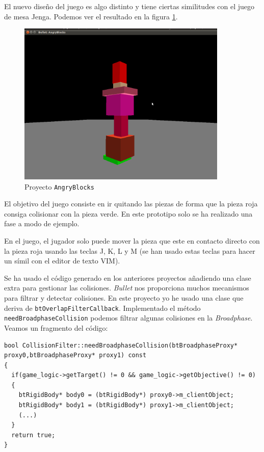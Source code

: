 \documentclass[12pt]{article}
\begin{document}
El nuevo diseño del juego es algo distinto y tiene ciertas similitudes con el juego de mesa Jenga. Podemos ver el resultado en la figura \ref{fig:angryblocks}.

\begin{figure}[h]
\begin{center}
 \includegraphics[width=10cm]{figures/angryblocks.png}
 \caption{Proyecto \texttt{AngryBlocks}}
 \label{fig:angryblocks}
\end{center}
\end{figure}

El objetivo del juego consiste en ir quitando las piezas de forma que la pieza roja consiga colisionar con la pieza verde. En este prototipo solo se ha realizado una fase a modo de ejemplo.

En el juego, el jugador solo puede mover la pieza que este en contacto directo con la pieza roja usando las teclas J, K, L y M (se han usado estas teclas para hacer un símil con el editor de texto VIM).

Se ha usado el código generado en los anteriores proyectos añadiendo una clase extra para gestionar las colisiones. \textit{Bullet} nos proporciona muchos mecanismos para filtrar y detectar colisiones. En este proyecto yo he usado una clase que deriva de \texttt{btOverlapFilterCallback}. Implementado el método \texttt{needBroadphaseCollision} podemos filtrar algunas colisiones en la \textit{Broadphase}. Veamos un fragmento del código:

{\scriptsize
\begin{verbatim}
bool CollisionFilter::needBroadphaseCollision(btBroadphaseProxy* proxy0,btBroadphaseProxy* proxy1) const
{
  if(game_logic->getTarget() != 0 && game_logic->getObjective() != 0)
  {
    btRigidBody* body0 = (btRigidBody*) proxy0->m_clientObject;
    btRigidBody* body1 = (btRigidBody*) proxy1->m_clientObject;
    (...)
  }
  return true;
}
\end{verbatim}
}
\end{document}
